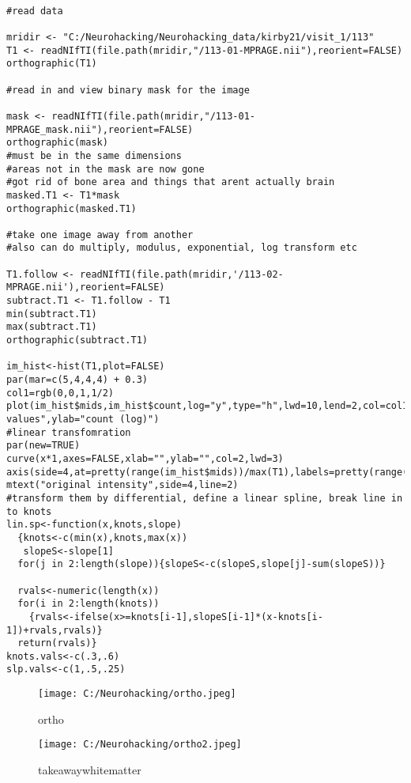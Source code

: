 \documentclass[]{article}
\begin{document}
\begin{verbatim}

#read data 

mridir <- "C:/Neurohacking/Neurohacking_data/kirby21/visit_1/113"
T1 <- readNIfTI(file.path(mridir,"/113-01-MPRAGE.nii"),reorient=FALSE)
orthographic(T1)

#read in and view binary mask for the image

mask <- readNIfTI(file.path(mridir,"/113-01-MPRAGE_mask.nii"),reorient=FALSE)
orthographic(mask)
#must be in the same dimensions
#areas not in the mask are now gone
#got rid of bone area and things that arent actually brain
masked.T1 <- T1*mask
orthographic(masked.T1)

#take one image away from another 
#also can do multiply, modulus, exponential, log transform etc

T1.follow <- readNIfTI(file.path(mridir,'/113-02-MPRAGE.nii'),reorient=FALSE)
subtract.T1 <- T1.follow - T1
min(subtract.T1)
max(subtract.T1)
orthographic(subtract.T1)

im_hist<-hist(T1,plot=FALSE)
par(mar=c(5,4,4,4) + 0.3)
col1=rgb(0,0,1,1/2)
plot(im_hist$mids,im_hist$count,log="y",type="h",lwd=10,lend=2,col=col1,xlab="intentsity values",ylab="count (log)")
#linear transfomration
par(new=TRUE)
curve(x*1,axes=FALSE,xlab="",ylab="",col=2,lwd=3)
axis(side=4,at=pretty(range(im_hist$mids))/max(T1),labels=pretty(range(im_hist$mids)))
mtext("original intensity",side=4,line=2)
#transform them by differential, define a linear spline, break line in to knots
lin.sp<-function(x,knots,slope)
  {knots<-c(min(x),knots,max(x))
   slopeS<-slope[1]
  for(j in 2:length(slope)){slopeS<-c(slopeS,slope[j]-sum(slopeS))}
   
  rvals<-numeric(length(x))
  for(i in 2:length(knots))
    {rvals<-ifelse(x>=knots[i-1],slopeS[i-1]*(x-knots[i-1])+rvals,rvals)}
  return(rvals)}
knots.vals<-c(.3,.6)
slp.vals<-c(1,.5,.25) 
\end{verbatim}

\begin{figure}
\centering
\texttt{[image: C:/Neurohacking/ortho.jpeg]}
\caption{ortho}
\end{figure}

\begin{figure}
\centering
\texttt{[image: C:/Neurohacking/ortho2.jpeg]}
\caption{takeawaywhitematter}
\end{figure}
\end{document}

